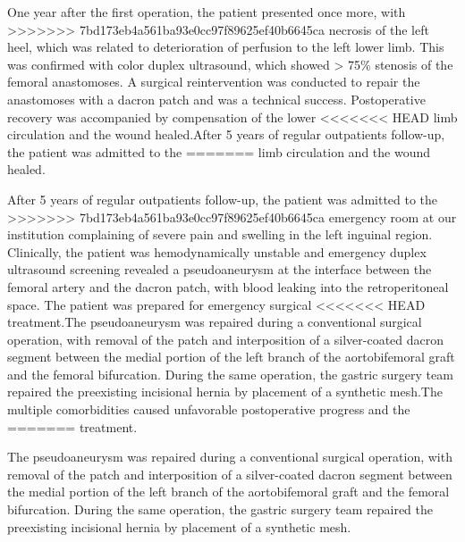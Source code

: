 \documentclass[numberinsection,times,10pt,spreadimages]{memoir}
\begin{document}
One year after the first operation, the patient presented once more, with
>>>>>>> 7bd173eb4a561ba93e0cc97f89625ef40b6645ca
necrosis of the left heel, which was related to deterioration of perfusion to
the left lower limb. This was confirmed with color duplex ultrasound, which
showed > 75\% stenosis of the femoral anastomoses. A surgical reintervention
was conducted to repair the anastomoses with a dacron patch and was a technical
success. Postoperative recovery was accompanied by compensation of the lower
<<<<<<< HEAD
limb circulation and the wound healed.After 5 years of regular outpatients
follow-up, the patient was admitted to the
=======
limb circulation and the wound healed.

After 5 years of regular outpatients follow-up, the patient was admitted to the
>>>>>>> 7bd173eb4a561ba93e0cc97f89625ef40b6645ca
emergency room at our institution complaining of severe pain and swelling in the
left inguinal region. Clinically, the patient was hemodynamically unstable and
emergency duplex ultrasound screening revealed a pseudoaneurysm at the interface
between the femoral artery and the dacron patch, with blood leaking into the
retroperitoneal space. The patient was prepared for emergency surgical
<<<<<<< HEAD
treatment.The pseudoaneurysm was repaired during a conventional surgical
operation, with
removal of the patch and interposition of a silver-coated dacron segment between
the medial portion of the left branch of the aortobifemoral graft and the
femoral bifurcation. During the same operation, the gastric surgery team
repaired the preexisting incisional hernia by placement of a synthetic mesh.The
multiple comorbidities caused unfavorable postoperative progress and the
=======
treatment.

The pseudoaneurysm was repaired during a conventional surgical operation, with
removal of the patch and interposition of a silver-coated dacron segment between
the medial portion of the left branch of the aortobifemoral graft and the
femoral bifurcation. During the same operation, the gastric surgery team
repaired the preexisting incisional hernia by placement of a synthetic mesh.
\end{document}
